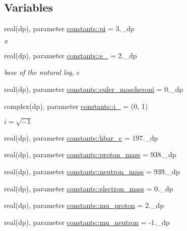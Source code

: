 \subsection*{Variables}
\begin{DoxyCompactItemize}
\item 
real(dp), parameter \hyperlink{namespaceconstants_ae6603ac4cc80bb9d44e9b34575227d9e}{constants\+::pi} = 3.\+\_\+dp
\begin{DoxyCompactList}\small\item\em $\pi$ \end{DoxyCompactList}\item 
real(dp), parameter \hyperlink{namespaceconstants_a82e235fc098d04e5dc1d79aa3b878c0a}{constants\+::e\+\_\+} = 2.\+\_\+dp
\begin{DoxyCompactList}\small\item\em base of the natural log, $ e $ \end{DoxyCompactList}\item 
real(dp), parameter \hyperlink{namespaceconstants_ab36052cb8be17b195edefeaa931bcbd0}{constants\+::euler\+\_\+mascheroni} = 0.\+\_\+dp
\item 
complex(dp), parameter \hyperlink{namespaceconstants_a556a79f452ecd3c709ee7314147059e4}{constants\+::i\+\_\+} = (0, 1)
\begin{DoxyCompactList}\small\item\em $ i = \sqrt{-1} $ \end{DoxyCompactList}\item 
real(dp), parameter \hyperlink{namespaceconstants_a4affe715f46867c0e712960ca8264838}{constants\+::hbar\+\_\+c} = 197.\+\_\+dp
\item 
real(dp), parameter \hyperlink{namespaceconstants_acaf7324e893fcf39c2ea181aff272f46}{constants\+::proton\+\_\+mass} = 938.\+\_\+dp
\item 
real(dp), parameter \hyperlink{namespaceconstants_a3e7dcf06a24fcb21e535ce1d65e99ade}{constants\+::neutron\+\_\+mass} = 939.\+\_\+dp
\item 
real(dp), parameter \hyperlink{namespaceconstants_ae39ccb38d503f1dd6f200f18fc41e5c0}{constants\+::electron\+\_\+mass} = 0.\+\_\+dp
\item 
real(dp), parameter \hyperlink{namespaceconstants_a895e65a76e6d376282dfe68349b71346}{constants\+::mu\+\_\+proton} = 2.\+\_\+dp
\item 
real(dp), parameter \hyperlink{namespaceconstants_a50d3a5b790a40f8fa27b7119e24835d3}{constants\+::mu\+\_\+neutron} = -\/1.\+\_\+dp

\end{DoxyCompactItemize}
